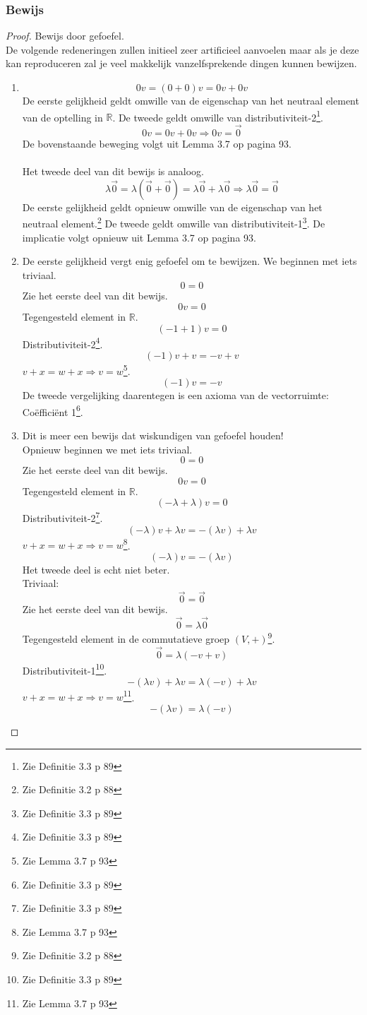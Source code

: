 \documentclass[lineaire_algebra_oplossingen.tex]{subfiles}
\begin{document}
\subsubsection*{Bewijs}
\begin{proof}
Bewijs door gefoefel.\\
De volgende redeneringen zullen initieel zeer artificieel aanvoelen maar als je deze kan reproduceren zal je veel makkelijk vanzelfsprekende dingen kunnen bewijzen.
\begin{enumerate}
\item 
\[
0v = (0+0)v = 0v + 0v
\]
De eerste gelijkheid geldt omwille van de eigenschap van het neutraal element van de optelling in $\mathbb{R}$. De tweede geldt omwille van distributiviteit-2\footnote{Zie Definitie 3.3 p 89}.
\[
0v = 0v+0v \Rightarrow 0v = \vec{0}
\]
De bovenstaande beweging volgt uit Lemma 3.7 op pagina 93.\\\\
Het tweede deel van dit bewijs is analoog.
\[
\lambda\vec{0} = \lambda(\vec{0}+\vec{0}) = \lambda\vec{0} + \lambda\vec{0} \Rightarrow \lambda\vec{0} = \vec{0}
\]
De eerste gelijkheid geldt opnieuw omwille van de eigenschap van het neutraal element.\footnote{Zie Definitie 3.2 p 88} De tweede geldt omwille van distributiviteit-1\footnote{Zie Definitie 3.3 p 89}. De implicatie volgt opnieuw uit Lemma 3.7 op pagina 93.

\item
De eerste gelijkheid vergt enig gefoefel om te bewijzen.
We beginnen met iets triviaal.
\[0 = 0\]
Zie het eerste deel van dit bewijs.
\[0v = 0\]
Tegengesteld element in $\mathbb{R}$.
\[(-1+1)v = 0\]
Distributiviteit-2\footnote{Zie Definitie 3.3 p 89}.
\[(-1)v + v = -v + v\]
$v+x=w+x \Rightarrow v=w$\footnote{Zie Lemma 3.7 p 93}.
\[ (-1)v = -v\]
De tweede vergelijking daarentegen is een axioma van de vectorruimte: Co\"effici\"ent 1\footnote{Zie Definitie 3.3 p 89}.

\item Dit is meer een bewijs dat wiskundigen van gefoefel houden!\\
Opnieuw beginnen we met iets triviaal.
\[0=0\]
Zie het eerste deel van dit bewijs.
\[0v = 0\]
Tegengesteld element in $\mathbb{R}$.
\[(-\lambda+\lambda)v = 0\]
Distributiviteit-2\footnote{Zie Definitie 3.3 p 89}.
\[(-\lambda)v + \lambda v = -(\lambda v) + \lambda v\]
$v+x=w+x \Rightarrow v=w$\footnote{Zie Lemma 3.7 p 93}.
\[(-\lambda)v = -(\lambda v)\]
Het tweede deel is echt niet beter.\\
Triviaal:
\[\vec{0} = \vec{0}\]
Zie het eerste deel van dit bewijs.
\[\vec{0} = \lambda \vec{0}\]
Tegengesteld element in de commutatieve groep $(V,+)$\footnote{Zie Definitie 3.2 p 88}.
\[\vec{0} = \lambda (-v+v)\]
Distributiviteit-1\footnote{Zie Definitie 3.3 p 89}.
\[-(\lambda v) + \lambda v = \lambda(-v)+\lambda v\]
$v+x=w+x \Rightarrow v=w$\footnote{Zie Lemma 3.7 p 93}.
\[-(\lambda v) = \lambda(-v)\]
\end{enumerate}
\end{proof}
\end{document}
